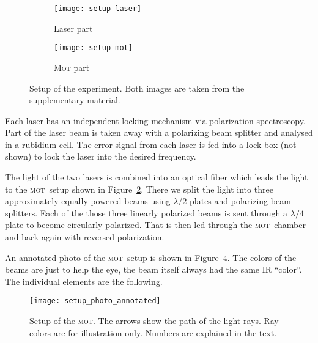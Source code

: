\documentclass[11pt, english, fleqn, DIV=15, headinclude, BCOR=2cm]{scrreprt}
\newcommand\mot{\textsc{mot}}
\begin{document}
\begin{figure}
    \centering
    \begin{subfigure}[c]{0.47\linewidth}
        \centering
        \texttt{[image: setup-laser]}
        \caption{%
            Laser part
        }
        \label{fig:setup-laser}
    \end{subfigure}
    \hfill
    \begin{subfigure}[c]{0.47\linewidth}
        \centering
        \texttt{[image: setup-mot]}
        \caption{%
            \textsc{Mot} part
        }
        \label{fig:setup-mot}
    \end{subfigure}
    \caption{%
        Setup of the experiment. Both images are taken from the supplementary
        material.
    }
    \label{fig:setup}
\end{figure}

Each laser has an independent locking mechanism via polarization spectroscopy.
Part of the laser beam is taken away with a polarizing beam splitter and
analysed in a rubidium cell. The error signal from each laser is fed into a
lock box (not shown) to lock the laser into the desired frequency.

The light of the two lasers is combined into an optical fiber which leads the
light to the \mot\ setup shown in Figure~\ref{fig:setup-mot}. There we split
the light into three approximately equally powered beams using $\lambda/2$
plates and polarizing beam splitters. Each of the those three linearly
polarized beams is sent through a $\lambda/4$ plate to become circularly
polarized. That is then led through the \mot\ chamber and back again with
reversed polarization.

An annotated photo of the \mot\ setup is shown in
Figure~\ref{fig:setup_photo_annotated}. The colors of the beams are just to
help the eye, the beam itself always had the same IR \enquote{color}. The
individual elements are the following.

\begin{figure}
    \centering
    \texttt{[image: setup\_photo\_annotated]}
    \caption{%
        Setup of the \mot. The arrows show the path of the light rays. Ray
        colors are for illustration only. Numbers are explained in the text.
    }
    \label{fig:setup_photo_annotated}
\end{figure}
\end{document}
